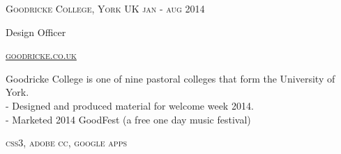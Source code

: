 {
    \textsc{\small{Goodricke College, York UK
        \hfill
        {\raggedleft
            jan - aug 2014
        } \\
        }
    }
    {\raggedright\large {
        Design Officer
    } \\}

    \textsc{\small\href{http://www.goodricke.com}{goodricke.co.uk}}

    \normalsize{
        Goodricke College is one of nine pastoral colleges that form the University of York.\\
        - Designed and produced material for welcome week 2014. \\
        - Marketed 2014 GoodFest (a free one day music festival)
    }

    \textsc{\small{\color{highlight}
        css3,
        adobe cc,
        google apps
    }}
}
